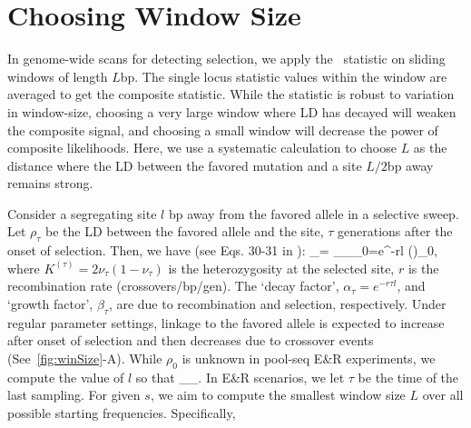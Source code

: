 \section{Choosing Window Size}
In genome-wide scans for detecting selection, we apply the \comale\
statistic on sliding windows of length $L$bp. The single locus
statistic values within the window are averaged to get the composite
statistic. While the statistic is robust to variation in window-size,
choosing a very large window where LD has decayed will weaken the
composite signal, and choosing a small window will decrease the power
of composite likelihoods. Here, we use a systematic calculation to
choose $L$ as the distance where the LD between the favored mutation
and a site $L/2$bp away remains strong.
\label{sec:winSize}


Consider a segregating site $l$ bp away from the favored allele in a
selective sweep.  Let $\rho_\tau$ be the LD between the favored allele
and the site, $\tau$ generations after the onset of selection. Then,
we have (see Eqs. 30-31 in \cite{stephan2006hitchhiking}): 
\beq
\rho_\tau= \alpha_\tau\beta_\tau \rho_0=e^{-r\tau l}
\left(\right)\rho_0\label{eq:ldt}, 
\eeq
where $K^{(\tau)}=2\nu_\tau(1-\nu_\tau)$ is the heterozygosity at the
selected site, $r$ is the recombination rate (crossovers/bp/gen). The
`decay factor', $\alpha_\tau=e^{-r\tau l}$, and `growth factor',
$\beta_\tau$, are due to recombination and selection, respectively.
Under regular parameter settings, linkage to the favored allele is
expected to increase after onset of selection and then 
decreases due to crossover events
(See~\ref{fig:winSize}-A).  While $\rho_0$ is
unknown in pool-seq E\&R experiments, we compute the value of $l$ so
that
\beq
\alpha_\tau \beta_.\label{eq:eq}
\eeq
In E\&R scenarios, we let $\tau$ be the time of the last sampling. For
given $s$, we aim to compute the smallest window size $L$ over all
possible starting frequencies. Specifically,

